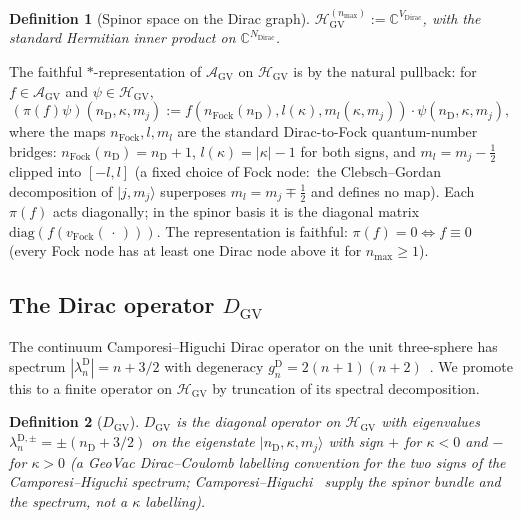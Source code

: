 \documentclass[11pt]{article}
\newtheorem{definition}{Definition}
\begin{document}
\begin{definition}[Spinor space on the Dirac graph]
\label{def:H_GV}
$\mathcal{H}_{\mathrm{GV}}^{(n_{\max})} := \mathbb{C}^{V_{\mathrm{Dirac}}}$,
with the standard Hermitian inner product on $\mathbb{C}^{N_{\mathrm{Dirac}}}$.
\end{definition}

The faithful $*$-representation of $\mathcal{A}_{\mathrm{GV}}$ on
$\mathcal{H}_{\mathrm{GV}}$ is by the natural pullback: for
$f \in \mathcal{A}_{\mathrm{GV}}$ and $\psi \in \mathcal{H}_{\mathrm{GV}}$,
\begin{equation}
   (\pi(f) \psi)(n_{\mathrm{D}}, \kappa, m_j)
   := f(n_{\mathrm{Fock}}(n_{\mathrm{D}}), l(\kappa), m_l(\kappa, m_j))
   \cdot \psi(n_{\mathrm{D}}, \kappa, m_j),
   \label{eq:representation}
\end{equation}
where the maps $n_{\mathrm{Fock}}, l, m_l$ are the standard Dirac-to-Fock
quantum-number bridges:
$n_{\mathrm{Fock}}(n_{\mathrm{D}}) = n_{\mathrm{D}} + 1$,
$l(\kappa) = |\kappa| - 1$ for both signs, and
$m_l = m_j - \tfrac12$ clipped into $[-l, l]$ (a fixed choice of Fock
node:\ the Clebsch--Gordan decomposition of $|j, m_j\rangle$ superposes
$m_l = m_j \mp \tfrac12$ and defines no map).
Each $\pi(f)$ acts diagonally; in the spinor basis it is the diagonal
matrix $\mathrm{diag}(f(v_{\mathrm{Fock}}(\,\cdot\,)))$.  The
representation is faithful: $\pi(f) = 0 \Leftrightarrow f \equiv 0$
(every Fock node has at least one Dirac node above it for $n_{\max}
\ge 1$).

\subsection{The Dirac operator $D_{\mathrm{GV}}$}

The continuum Camporesi--Higuchi Dirac operator on the unit
three-sphere has spectrum $|\lambda_n^{\mathrm{D}}| = n + 3/2$ with
degeneracy $g_n^{\mathrm{D}} = 2(n+1)(n+2)$~\cite{camporesi_higuchi1996}.
We promote this to a finite operator on $\mathcal{H}_{\mathrm{GV}}$
by truncation of its spectral decomposition.

\begin{definition}[$D_{\mathrm{GV}}$]
\label{def:D_GV_spectral}
$D_{\mathrm{GV}}$ is the diagonal operator on
$\mathcal{H}_{\mathrm{GV}}$ with eigenvalues
$\lambda_n^{\mathrm{D},\pm} = \pm (n_{\mathrm{D}} + 3/2)$
on the eigenstate $|n_{\mathrm{D}}, \kappa, m_j\rangle$ with sign
$+$ for $\kappa < 0$ and $-$ for $\kappa > 0$ (a GeoVac
Dirac--Coulomb labelling convention for the two signs of the
Camporesi--Higuchi spectrum; Camporesi--Higuchi~\cite{camporesi_higuchi1996}
supply the spinor bundle and the spectrum, not a $\kappa$ labelling).
\end{definition}
\end{document}
